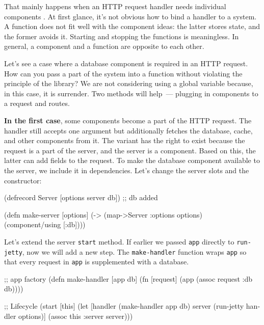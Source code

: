 That mainly happens when an HTTP request handler needs individual components . At first glance, it's not obvious how to bind a handler to a system. A function does not fit well with the component ideas: the latter stores state, and the former avoids it. Starting and stopping the functions is meaningless. In general, a component and a function are opposite to each other.

Let's see a case where a database component is required in an HTTP request. How can you pass a part of the system into a function without violating the principle of the library? We are not considering using a global variable because, in this case, it is surrender. Two methods will help~--- plugging in components to a request and routes.


\textbf{In the first case}, some components become a part of the HTTP request. The handler still accepts one argument but additionally fetches the database, cache, and other components from it. The variant has the right to exist because the request is a part of the server, and the server is a component. Based on this, the latter can add fields to the request. To make the database component available to the server, we include it in dependencies. Let's change the server slots and the constructor:

\begin{english}
  \begin{clojure}
(defrecord Server
  [options server db]) ;; db added

(defn make-server
  [options]
  (-> (map->Server {:options options})
      (component/using [:db])))
  \end{clojure}
\end{english}

Let's extend the server \verb|start| method. If earlier we passed \verb|app| directly to \verb|run-jetty|, now we will add a new step. The \texttt{make\--hand\-ler} function wraps \verb|app| so that every request in \verb|app| is supplemented with a database.

\ifnarrow

\begin{english}
  \begin{clojure}
;; app factory
(defn make-handler [app db]
  (fn [request]
    (app (assoc request :db db))))

;; Lifecycle
(start [this]
  (let [handler (make-handler app db)
        server (run-jetty handler
                 options)]
    (assoc this :server server)))
  \end{clojure}
\end{english}


